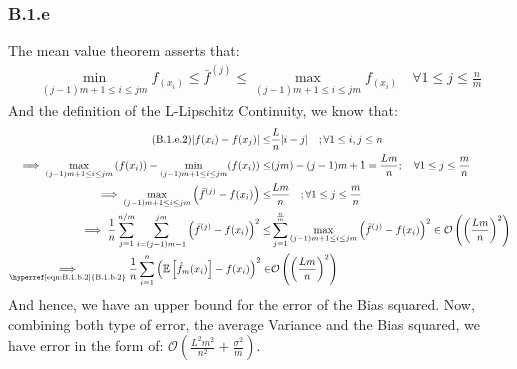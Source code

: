 \documentclass[]{article}
\begin{document}
    \subsubsection*{B.1.e}
        The mean value theorem asserts that: 
        \begin{align*}\tag{B.1.e.1}\label{eqn:B.1.e.1}
            \min_{(j - 1)m + 1\le i\le jm} f_(x_i)\le 
            \bar{f}^{(j)}
            \le \max_{(j - 1)m +1\le i \le jm} f_(x_i)
            \quad \forall 1 \le j \le \frac{n}{m}
        \end{align*}
        And the definition of the L-Lipschitz Continuity, we know that: 
        \begin{align*}\tag{B.1.e.2}\label{eqn:B.1.e.2}
            |f(x_i) - f(x_j)| \le& \frac{L}{n}|i - j| \quad ;\forall 1 \le i,j \le n
            \\
            \implies
            \max_{(j - 1)m + 1\le i \le jm}
            \left(
                f(x_i) 
            \right)
            - 
            \min_{(j - 1)m + 1\le i \le jm}
            (f(x_i))
            \le& (jm) - (j-1)m + 1 = \frac{Lm}{n}
            ;\quad \forall 1 \le j \le \frac{m}{n}
            \\
            \implies
            \max_{(j-1)m + 1 \le i \le jm}
            \left(
                \bar{f}^{(j)} - f(x_i)
            \right)
            \le&
            \frac{Lm}{n} \quad ; \forall 1 \le j \le \frac{m}{n}
            \\
            \implies
            \frac{1}{n}\sum_{j = 1}^{n/m}\sum_{i = (j - 1)m - 1}^{jm}\left(
                \bar{f}^{(j)} - f(x_i)
            \right)^2
            \le&
            \sum_{j = 1}^{\frac{n}{m}}
            \max_{(j-1)m + 1 \le i \le jm}
            \left(
                \bar{f}^{(j)} - f(x_i)
            \right)^2
            \in
            \mathcal{O}
            \left(
                \left(
                    \frac{Lm}{n}
                \right)^2
            \right)
            \\
            \underset{
                \text{\hyperref[eqn:B.1.b.2]{B.1.b.2}}
                }
                {\implies}
            \frac{1}{n}\sum_{i = 1}^{n}\left(\mathbb{E}\left[\hat{f}_m(x_i)\right] - f(x_i)\right)^2
            \in&
            \mathcal{O}
            \left(
                \left(
                    \frac{Lm}{n}
                \right)^2
            \right)
        \end{align*}
        And hence, we have an upper bound for the error of the Bias squared. Now, combining both type of error, the average Variance and the Bias squared, we have error in the form of: $\mathcal{O}(\frac{L^2m^2}{n^2} + \frac{\sigma^2}{m})$. 
\end{document}
